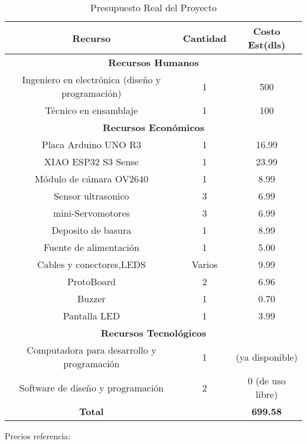 \begin{table}[H]
    \centering
    \begin{tabular}{|c|c|c|}
        \hline
        \textbf{Recurso} & \textbf{Cantidad} & \textbf{Costo Est(dls)} \\
        \hline
        \multicolumn{3}{|c|}{\textbf{Recursos Humanos}} \\
        \hline
        Ingeniero en electrónica (diseño y programación) & 1 & 500 \\
        \hline
        Técnico en ensamblaje & 1 & 100 \\
        \hline
        \multicolumn{3}{|c|}{\textbf{Recursos Económicos}} \\
        \hline
        Placa Arduino UNO R3 & 1 & 16.99\\
        \hline
        XIAO ESP32 S3 Sense  & 1 & 23.99 \\
        \hline
        Módulo de cámara OV2640 & 1 & 8.99\\
        \hline
        Sensor ultrasonico & 3 & 6.99 \\
        \hline
        mini-Servomotores & 3 & 6.99 \\
        \hline
        Deposito de basura & 1 & 8.99 \\
        \hline
        Fuente de alimentación & 1 & 5.00 \\
        \hline
        Cables y conectores,LEDS & Varios & 9.99 \\
        \hline
        ProtoBoard & 2 & 6.96 \\
        \hline
        Buzzer & 1 & 0.70\\
        \hline
        Pantalla LED & 1 & 3.99\\
        \hline
        \multicolumn{3}{|c|}{\textbf{Recursos Tecnológicos}} \\
        \hline
        Computadora para desarrollo y programación & 1 & (ya disponible)\\
        \hline
        Software de diseño y programación & 2 & 0 (de uso libre) \\
        \hline
        \textbf{Total} & & \textbf{699.58} \\
        \hline
    \end{tabular}
    \caption{Presupuesto Real del Proyecto}{Precios referencia:~\cite{link_miniservos,link_arduino,link_buzzer,link_conectores_cables,link_protoboard}}
    \label{tab:presupuesto_real}
\end{table}

